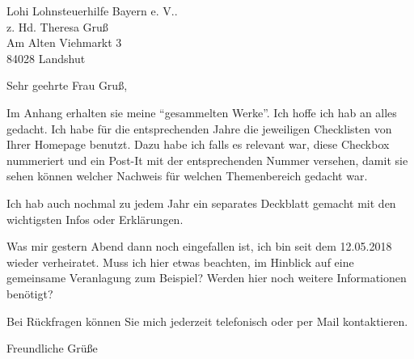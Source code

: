 \documentclass[version=last, Briefvorlage]{scrlttr2}
\begin{document}
%
\begin{letter}{%
Lohi Lohnsteuerhilfe Bayern e. V.. \\
z. Hd. Theresa Gruß \\
Am Alten Viehmarkt 3 \\
84028 Landshut \\
	}
	\opening{Sehr geehrte Frau Gruß,}
	Im Anhang erhalten sie meine ``gesammelten Werke''. Ich hoffe ich hab an alles gedacht. Ich habe für die entsprechenden Jahre 
	die jeweiligen Checklisten von Ihrer Homepage benutzt. Dazu habe ich falls es relevant war, diese Checkbox nummeriert und ein 
	Post-It mit der entsprechenden Nummer versehen, damit sie sehen können welcher Nachweis für welchen Themenbereich gedacht war.
	
	Ich hab auch nochmal zu jedem Jahr ein separates Deckblatt gemacht mit den wichtigsten Infos oder Erklärungen. 
	
	Was mir gestern Abend dann noch eingefallen ist, ich bin seit dem 12.05.2018 wieder verheiratet. Muss ich hier etwas beachten, im Hinblick auf eine 
	gemeinsame Veranlagung zum Beispiel? Werden hier noch weitere Informationen benötigt?
	
	Bei Rückfragen können Sie mich jederzeit telefonisch oder per Mail kontaktieren.
	\closing{Freundliche Grüße}
\end{letter}
%
\end{document}
